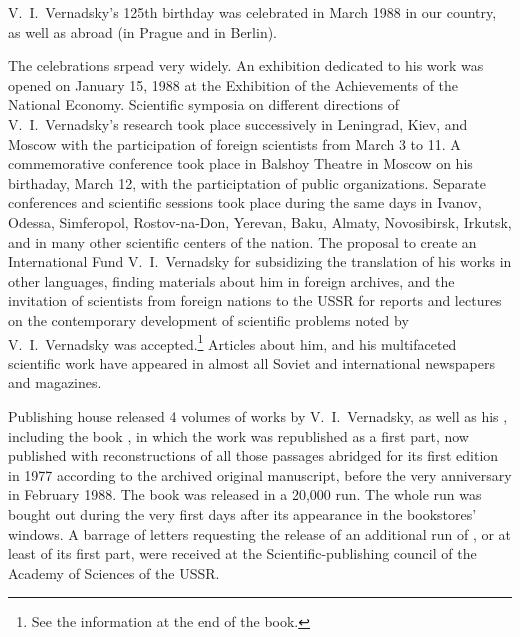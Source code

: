 V.~I.\ Vernadsky's 125th birthday was celebrated in March 1988 in our country,
as well as abroad (in Prague and in Berlin).

The celebrations srpead very widely.  An exhibition dedicated to his work was
opened on January 15, 1988 at the Exhibition of the Achievements of the
National Economy.  Scientific symposia on different directions of V.~I.\ Vernadsky's
research took place successively in Leningrad, Kiev, and Moscow with the
participation of foreign scientists from March 3 to 11.  A commemorative
conference took place in Balshoy Theatre in Moscow
on his birthaday, March 12, with the participtation of public organizations.
Separate conferences and scientific sessions took place during the same days in
Ivanov, Odessa, Simferopol, Rostov-na-Don, Yerevan, Baku,
Almaty, Novosibirsk, Irkutsk, and in many other
scientific centers of the nation.  The proposal to create an International Fund
V.~I.\ Vernadsky for
subsidizing the translation of his works in other languages, finding materials
about him in foreign archives, and the invitation of scientists from foreign
nations to the USSR for reports and lectures on the contemporary development of
scientific problems noted by V.~I.\ Vernadsky was accepted.\footnote{See the
information at the end of the book.}  Articles about him, and his multifaceted
scientific work have appeared in almost all Soviet and international newspapers
and magazines.

Publishing house  released 4 volumes of works
by V.~I.\ Vernadsky, as well as his , including the
book , in which the work  was republished as a first part, now
published with reconstructions of all those passages abridged for its first
edition in 1977 according to the archived original manuscript, before the very
anniversary in February 1988.  The book was released in a 20,000 run.  The whole
run was bought out during the very first days after its appearance in the
bookstores' windows.  A barrage of letters requesting the release of an
additional run of , or at least of its first
part, were received at the Scientific-publishing council of the Academy of
Sciences of the USSR.

